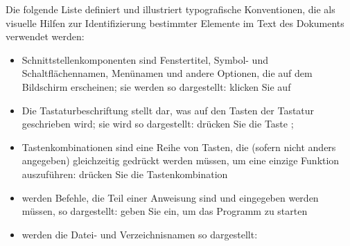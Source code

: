 Die folgende Liste definiert und illustriert typografische Konventionen, die als visuelle Hilfen zur Identifizierung bestimmter Elemente im Text des Dokuments verwendet werden:

\begin{itemize}
	\item Schnittstellenkomponenten sind Fenstertitel, Symbol- und Schaltflächennamen, Menünamen und andere Optionen, die auf dem Bildschirm erscheinen; sie werden so dargestellt:%
		\newline
		\hspace*{1.5cm}klicken Sie auf %
	\item Die Tastaturbeschriftung stellt dar, was auf den Tasten der Tastatur geschrieben wird; sie wird so dargestellt:%
		\newline
		\hspace*{1.5cm}drücken Sie die Taste ;%
	\item Tastenkombinationen sind eine Reihe von Tasten, die (sofern nicht anders angegeben) gleichzeitig gedrückt werden müssen, um eine einzige Funktion auszuführen:%
		\newline
		\hspace*{1.5cm}drücken Sie die Tastenkombination %
	\item werden Befehle, die Teil einer Anweisung sind und eingegeben werden müssen, so dargestellt:%
		\newline
		\hspace*{1.5cm}geben Sie  ein, um das Programm zu starten%
	\item werden die Datei- und Verzeichnisnamen so dargestellt:%

\end{itemize}
